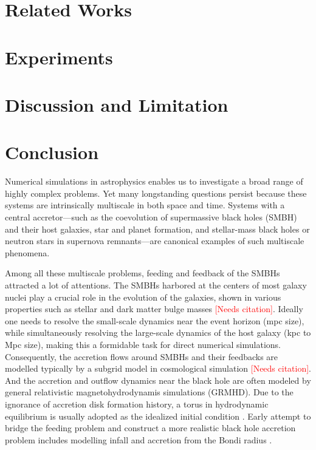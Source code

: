 \documentclass{article}
\newcommand{\red}{\textcolor{red}}
\newcommand{\AddCite}{\red{[Needs citation]}}
\newcommand{\hywcom}[1]{{\color{purple}{[HYW: #1]}}}
\begin{document}
\section{Related Works}

\section{Experiments}

\section{Discussion and Limitation}

\section{Conclusion}


\hywcom{Multiscale problems.}
Numerical simulations in astrophysics enables us to investigate a broad range of highly complex problems.
Yet many longstanding questions persist because these systems are intrinsically multiscale in both space and time.
Systems with a central accretor—such as the coevolution of supermassive black holes (SMBH) and their host galaxies, star and planet formation, and stellar-mass black holes or neutron stars in supernova remnants—are canonical examples of such multiscale phenomena.

Among all these multiscale problems, feeding and feedback of the SMBHs attracted a lot of attentions.
The SMBHs harbored at the centers of most galaxy nuclei play a crucial role in the evolution of the galaxies, shown in various properties such as stellar and dark matter bulge masses \AddCite.
Ideally one needs to resolve the small-scale dynamics near the event horizon (mpc size), while simultaneously
resolving the large-scale dynamics of the host galaxy (kpc to Mpc size),
making this a formidable task for direct numerical simulations.
Consequently, the accretion flows around SMBHs and their feedbacks are modelled typically by a subgrid model in cosmological simulation \AddCite. 
And the accretion and outflow dynamics near the black hole are often modeled by general relativistic magnetohydrodynamis simulations (GRMHD).
Due to the ignorance of accretion disk formation history, a torus in hydrodynamic equilibrium is usually adopted as the idealized initial condition \cite{1976ApJ...207..962F}.
Early attempt to bridge the feeding problem and construct a more realistic black hole accretion problem includes modelling infall and accretion from the Bondi radius \cite{Bondi:1952MNRAS.112..195B}.
\end{document}
